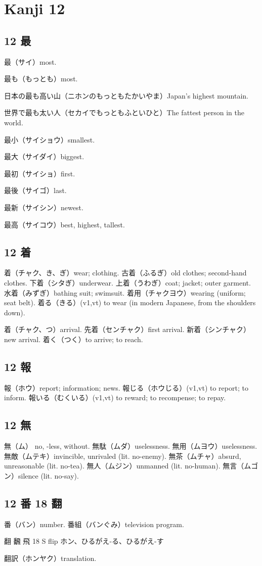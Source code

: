 \chapter{Kanji 12}

\section{12 最}

最（サイ）most.

最も（もっとも）most.

日本の最も高い山（ニホンのもっともたかいやま）Japan's highest mountain.

世界で最も太い人（セカイでもっともふといひと）The fattest person in the world.

最小（サイショウ）smallest.

最大（サイダイ）biggest.

最初（サイショ）first.

最後（サイゴ）last.

最新（サイシン）newest.

最高（サイコウ）best, highest, tallest.

\section{12 着}

着（チャク、き、ぎ）wear; clothing.
古着（ふるぎ）old clothes; second-hand clothes.
下着（シタぎ）underwear.
上着（うわぎ）coat; jacket; outer garment.
水着（みずぎ）bathing suit; swimsuit.
着用（チャクヨウ）wearing (uniform; seat belt).
着る（きる）(v1,vt) to wear (in modern Japanese, from the shoulders down).

着（チャク、つ）arrival.
先着（センチャク）first arrival.
新着（シンチャク）new arrival.
着く（つく）to arrive; to reach.

\section{12 報}

報（ホウ）report; information; news.
報じる（ホウじる）(v1,vt) to report; to inform.
報いる（むくいる）(v1,vt) to reward; to recompense; to repay.

\section{12 無}

無（ム） no, -less, without.
無駄（ムダ）uselessness.
無用（ムヨウ）uselessness.
無敵（ムテキ）invincible, unrivaled (lit. no-enemy).
無茶（ムチャ）absurd, unreasonable (lit. no-tea).
無人（ムジン）unmanned (lit. no-human).
無言（ムゴン）silence (lit. no-say).

\section{12 番 18 翻}

番（バン）number.
番組（バンぐみ）television program.

翻 飜 飛 18 S  flip ホン、ひるがえ-る、ひるがえ-す

翻訳（ホンヤク）translation.
